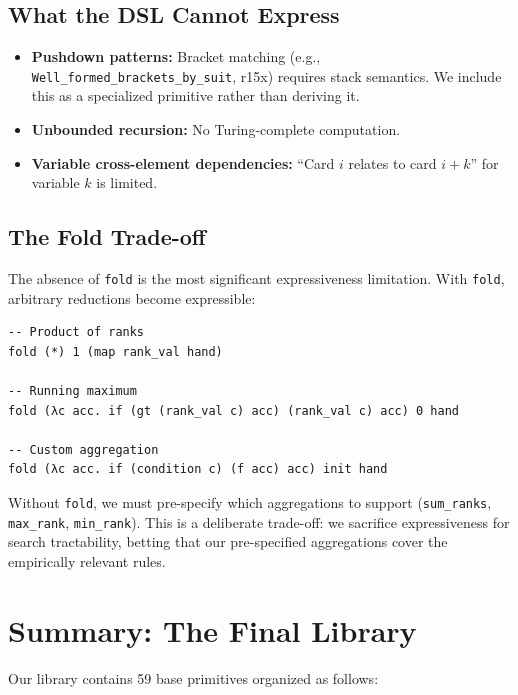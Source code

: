 \documentclass[11pt]{article}
\begin{document}
\subsection{What the DSL Cannot Express}

\begin{itemize}
    \item \textbf{Pushdown patterns:} Bracket matching (e.g., \texttt{Well\_formed\_brackets\_by\_suit}, r15x) requires stack semantics. We include this as a specialized primitive rather than deriving it.
    \item \textbf{Unbounded recursion:} No Turing-complete computation.
    \item \textbf{Variable cross-element dependencies:} ``Card $i$ relates to card $i+k$'' for variable $k$ is limited.
\end{itemize}

\subsection{The Fold Trade-off}

The absence of \texttt{fold} is the most significant expressiveness limitation. With \texttt{fold}, arbitrary reductions become expressible:

\begin{lstlisting}[style=dsl]
-- Product of ranks
fold (*) 1 (map rank_val hand)

-- Running maximum
fold (λc acc. if (gt (rank_val c) acc) (rank_val c) acc) 0 hand

-- Custom aggregation
fold (λc acc. if (condition c) (f acc) acc) init hand
\end{lstlisting}

Without \texttt{fold}, we must pre-specify which aggregations to support (\texttt{sum\_ranks}, \texttt{max\_rank}, \texttt{min\_rank}). This is a deliberate trade-off: we sacrifice expressiveness for search tractability, betting that our pre-specified aggregations cover the empirically relevant rules.

\section{Summary: The Final Library}

Our library contains 59 base primitives organized as follows:
\end{document}
